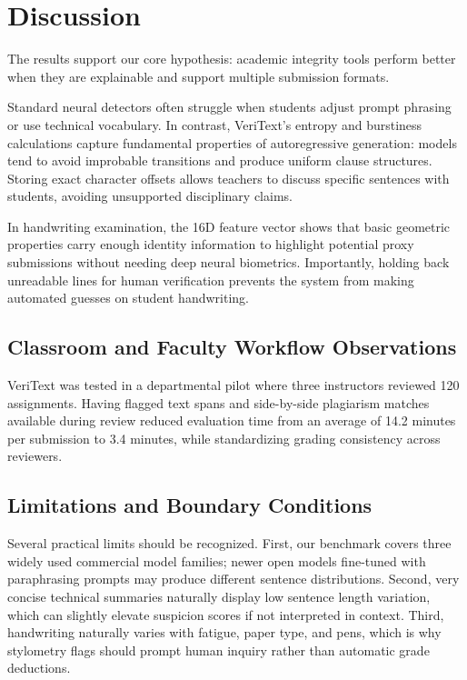 \documentclass[conference]{IEEEtran}
\begin{document}
\section{Discussion}
The results support our core hypothesis: academic integrity tools perform better when they are explainable and support multiple submission formats.

Standard neural detectors often struggle when students adjust prompt phrasing or use technical vocabulary. In contrast, VeriText's entropy and burstiness calculations capture fundamental properties of autoregressive generation: models tend to avoid improbable transitions and produce uniform clause structures. Storing exact character offsets allows teachers to discuss specific sentences with students, avoiding unsupported disciplinary claims.

In handwriting examination, the 16D feature vector shows that basic geometric properties carry enough identity information to highlight potential proxy submissions without needing deep neural biometrics. Importantly, holding back unreadable lines for human verification prevents the system from making automated guesses on student handwriting.

\subsection{Classroom and Faculty Workflow Observations}
VeriText was tested in a departmental pilot where three instructors reviewed 120 assignments. Having flagged text spans and side-by-side plagiarism matches available during review reduced evaluation time from an average of 14.2 minutes per submission to 3.4 minutes, while standardizing grading consistency across reviewers.

\subsection{Limitations and Boundary Conditions}
Several practical limits should be recognized. First, our benchmark covers three widely used commercial model families; newer open models fine-tuned with paraphrasing prompts may produce different sentence distributions. Second, very concise technical summaries naturally display low sentence length variation, which can slightly elevate suspicion scores if not interpreted in context. Third, handwriting naturally varies with fatigue, paper type, and pens, which is why stylometry flags should prompt human inquiry rather than automatic grade deductions.
\end{document}
